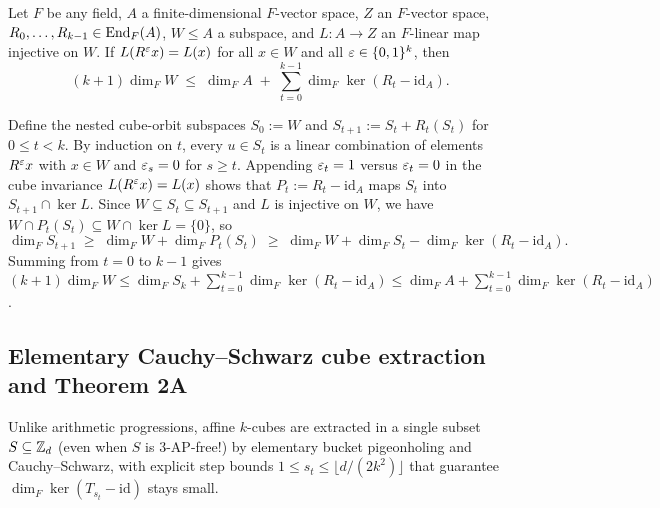 \begin{lemma}\label{lem:affine-cube}
Let $F$ be any field, $A$ a finite-dimensional $F$-vector space, $Z$ an $F$-vector space,
$R_0, \dots, R_{k-1} \in \operatorname{End}_F(A)$, $W \le A$ a subspace, and $L : A \to Z$ an $F$-linear map
injective on $W$. If $L(R^\varepsilon x) = L(x)$ for all $x \in W$ and all $\varepsilon \in \{0,1\}^k$, then
\[
  (k + 1)\dim_F W \;\le\; \dim_F A \;+\; \sum_{t=0}^{k-1} \dim_F \ker(R_t - \mathrm{id}_A).
\]
\end{lemma}
\begin{outline}
Define the nested cube-orbit subspaces $S_0 := W$ and $S_{t+1} := S_t + R_t(S_t)$ for
$0 \le t < k$. By induction on $t$, every $u \in S_t$ is a linear combination of elements
$R^\varepsilon x$ with $x \in W$ and $\varepsilon_s = 0$ for $s \ge t$. Appending $\varepsilon_t = 1$ versus
$\varepsilon_t = 0$ in the cube invariance $L(R^\varepsilon x) = L(x)$ shows that $P_t := R_t - \mathrm{id}_A$
maps $S_t$ into $S_{t+1} \cap \ker L$. Since $W \subseteq S_t \subseteq S_{t+1}$ and $L$ is
injective on $W$, we have $W \cap P_t(S_t) \subseteq W \cap \ker L = \{0\}$, so
\[
  \dim_F S_{t+1} \;\ge\; \dim_F W + \dim_F P_t(S_t)
  \;\ge\; \dim_F W + \dim_F S_t - \dim_F \ker(R_t - \mathrm{id}_A).
\]
Summing from $t = 0$ to $k - 1$ gives $(k+1)\dim_F W \le \dim_F S_k + \sum_{t=0}^{k-1}
\dim_F\ker(R_t - \mathrm{id}_A) \le \dim_F A + \sum_{t=0}^{k-1} \dim_F\ker(R_t - \mathrm{id}_A)$.
\end{outline}

\subsection{Elementary Cauchy--Schwarz cube extraction and Theorem 2A}\label{sec:thm2a}

Unlike arithmetic progressions, affine $k$-cubes are extracted in a single subset $S \subseteq \mathbb{Z}_d$
(even when $S$ is $3$-AP-free!) by elementary bucket pigeonholing and Cauchy--Schwarz, with explicit
step bounds $1 \le s_t \le \lfloor d / (2 k^2)\rfloor$ that guarantee $\dim_F\ker(T_{s_t} - \mathrm{id})$
stays small.

